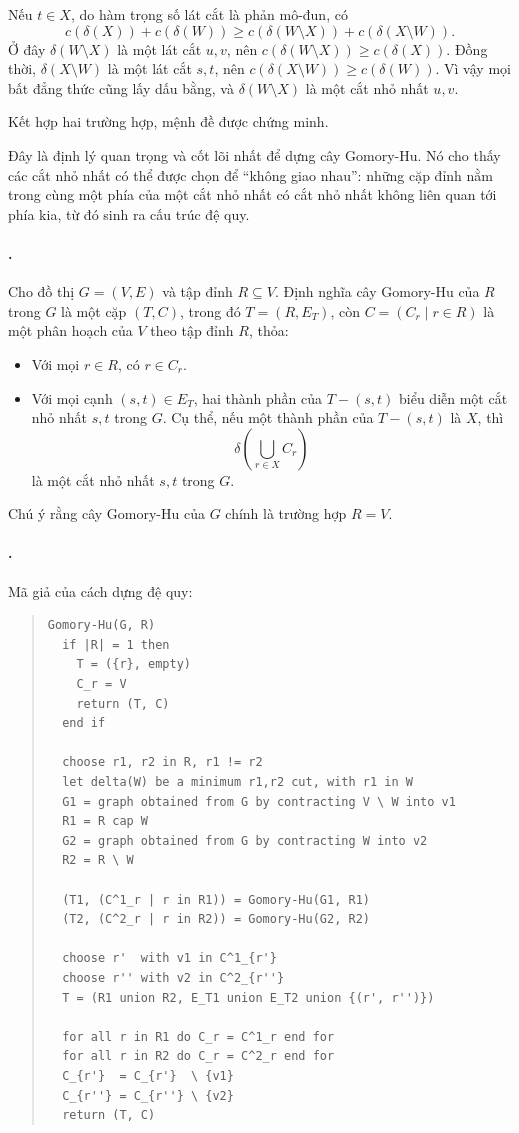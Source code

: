 \documentclass[11pt]{article}
\begin{document}
Nếu \(t\in X\), do hàm trọng số lát cắt là phản mô-đun, có
\[
  c(\delta(X))+c(\delta(W))
  \ge c(\delta(W\setminus X))+c(\delta(X\setminus W)).
\]
Ở đây \(\delta(W\setminus X)\) là một lát cắt \(u,v\), nên
\(c(\delta(W\setminus X))\ge c(\delta(X))\). Đồng thời, \(\delta(X\setminus
W)\) là một lát cắt \(s,t\), nên \(c(\delta(X\setminus W))\ge c(\delta(W))\).
Vì vậy mọi bất đẳng thức cũng lấy dấu bằng, và \(\delta(W\setminus X)\) là
một cắt nhỏ nhất \(u,v\).

Kết hợp hai trường hợp, mệnh đề được chứng minh.

Đây là định lý quan trọng và cốt lõi nhất để dựng cây Gomory-Hu. Nó cho thấy
các cắt nhỏ nhất có thể được chọn để ``không giao nhau'': những cặp đỉnh nằm
trong cùng một phía của một cắt nhỏ nhất có cắt nhỏ nhất không liên quan tới
phía kia, từ đó sinh ra cấu trúc đệ quy.

\paragraph{.}
Cho đồ thị \(G=(V,E)\) và tập đỉnh \(R\subseteq V\). Định nghĩa cây
Gomory-Hu của \(R\) trong \(G\) là một cặp \((T,C)\), trong đó
\(T=(R,E_T)\), còn \(C=(C_r\mid r\in R)\) là một phân hoạch của \(V\) theo
tập đỉnh \(R\), thỏa:
\begin{itemize}
  \item Với mọi \(r\in R\), có \(r\in C_r\).
  \item Với mọi cạnh \((s,t)\in E_T\), hai thành phần của
  \(T-(s,t)\) biểu diễn một cắt nhỏ nhất \(s,t\) trong \(G\). Cụ thể, nếu một
  thành phần của \(T-(s,t)\) là \(X\), thì
  \[
    \delta\left(\bigcup_{r\in X} C_r\right)
  \]
  là một cắt nhỏ nhất \(s,t\) trong \(G\).
\end{itemize}

Chú ý rằng cây Gomory-Hu của \(G\) chính là trường hợp \(R=V\).

\paragraph{.}
Mã giả của cách dựng đệ quy:
\begin{quote}
\small
\begin{verbatim}
Gomory-Hu(G, R)
  if |R| = 1 then
    T = ({r}, empty)
    C_r = V
    return (T, C)
  end if

  choose r1, r2 in R, r1 != r2
  let delta(W) be a minimum r1,r2 cut, with r1 in W
  G1 = graph obtained from G by contracting V \ W into v1
  R1 = R cap W
  G2 = graph obtained from G by contracting W into v2
  R2 = R \ W

  (T1, (C^1_r | r in R1)) = Gomory-Hu(G1, R1)
  (T2, (C^2_r | r in R2)) = Gomory-Hu(G2, R2)

  choose r'  with v1 in C^1_{r'}
  choose r'' with v2 in C^2_{r''}
  T = (R1 union R2, E_T1 union E_T2 union {(r', r'')})

  for all r in R1 do C_r = C^1_r end for
  for all r in R2 do C_r = C^2_r end for
  C_{r'}  = C_{r'}  \ {v1}
  C_{r''} = C_{r''} \ {v2}
  return (T, C)
\end{verbatim}
\end{quote}
\end{document}
